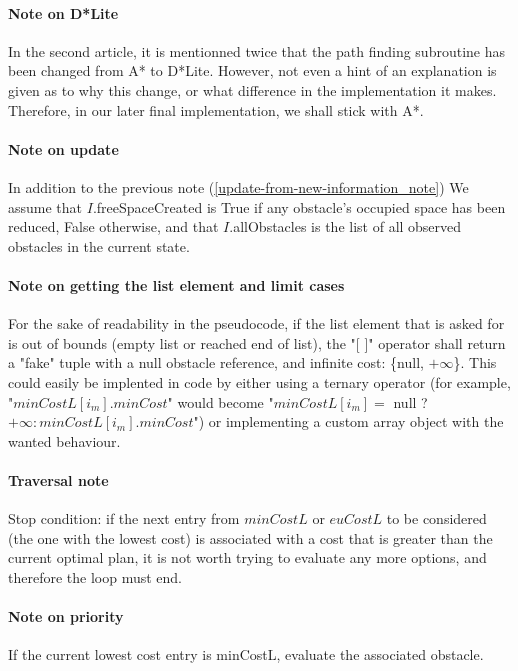\paragraph{Note on D*Lite}\label{d_star_note} In the second article, it is mentionned twice that the path finding subroutine has been changed from A* to D*Lite. However, not even a hint of an explanation is given as to why this change, or what difference in the implementation it makes. Therefore, in our later final implementation, we shall stick with A*.

\paragraph{Note on update}\label{second_update-from-new-information_note} In addition to the previous note (\ref{update-from-new-information_note}) We assume that $I$.freeSpaceCreated is True if any obstacle's occupied space has been reduced, False otherwise, and that $I$.allObstacles is the list of all observed obstacles in the current state.

\paragraph{Note on getting the list element and limit cases}\label{get_list_element_note} For the sake of readability in the pseudocode, if the list element that is asked for is out of bounds (empty list or reached end of list), the "[ ]" operator shall return a "fake" tuple with a null obstacle reference, and infinite cost: \{null, $+\infty$\}. This could easily be implented in code by either using a ternary operator (for example, "$minCostL[i_{m}].minCost$" would become "$minCostL[i_{m}] =$ null ? $+\infty: minCostL[i_{m}].minCost$") or implementing a custom array object with the wanted behaviour.

\paragraph{Traversal note}\label{list_traversal_note} Stop condition: if the next entry from $minCostL$ or $euCostL$ to be considered (the one with the lowest cost) is associated with a cost that is greater than the current optimal plan, it is not worth trying to evaluate any more options, and therefore the loop must end.

\paragraph{Note on priority}\label{minCostL_priority_note} If the current lowest cost entry is minCostL, evaluate the associated obstacle.

